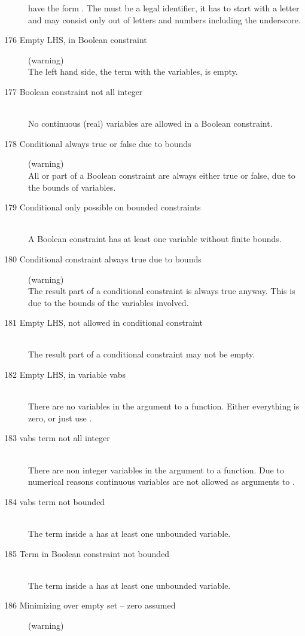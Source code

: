 \begin{description}
  have the form . The  must be a legal
  identifier, \ie it has to start with a letter and may consist only out
  of letters and numbers including the underscore. 
%
%
\item[176 Empty LHS, in Boolean constraint] (warning)\ \\
   The left hand side, \ie the term with the variables, is empty. 
\item[177 Boolean constraint not all integer]\ \\
   No continuous (real) variables are allowed in a Boolean constraint.
\item[178 Conditional always true or false due to bounds] (warning)\ \\
   All or part of a Boolean constraint are always either true or
   false, due to the bounds of variables.
\item[179 Conditional only possible on bounded constraints]\ \\
   A Boolean constraint has at least one variable without finite bounds.
\item[180 Conditional constraint always true due to bounds] (warning)\ \\
   The result part of a conditional constraint is always true anyway. 
   This is due to the bounds of the variables involved.
\item[181 Empty LHS, not allowed in conditional constraint]\ \\
   The result part of a conditional constraint may not be empty.
\item[182 Empty LHS, in variable vabs]\ \\
   There are no variables in the argument to a  function.
   Either everything is zero, or just use .
\item[183 vabs term not all integer]\ \\
   There are non integer variables in the argument to a  function.
   Due to numerical reasons continuous variables are not allowed as
   arguments to . 
\item[184 vabs term not bounded]\ \\
   The term inside a  has at least one unbounded variable.
\item[185 Term in Boolean constraint not bounded]\ \\
   The term inside a  has at least one unbounded variable.
%
%
\item[186 Minimizing over empty set -- zero assumed] (warning)\ \\

\end{description}
